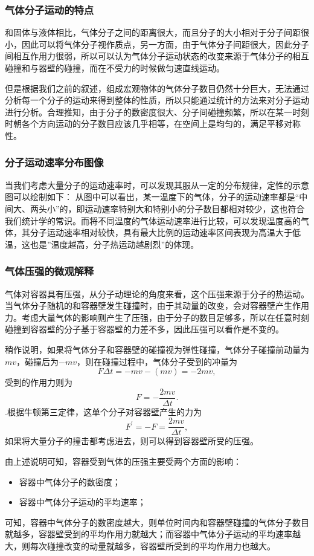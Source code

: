 \subsubsection{气体分子运动的特点}
和固体与液体相比，气体分子之间的距离很大，而且分子的大小相对于分子间距很小，因此可以将气体分子视作质点，另一方面，由于气体分子间距很大，因此分子间相互作用力很弱，所以可以认为气体分子运动状态的改变来源于气体分子的相互碰撞和与器壁的碰撞，而在不受力的时候做匀速直线运动。

但是根据我们之前的叙述，组成宏观物体的气体分子数目仍然十分巨大，无法通过分析每一个分子的运动来得到整体的性质，所以只能通过统计的方法来对分子运动进行分析。合理推知，由于分子的数密度很大、分子间碰撞频繁，所以在某一时刻时朝各个方向运动的分子数目应该几乎相等，在空间上是均匀的，满足平移对称性。

\subsubsection{分子运动速率分布图像}
当我们考虑大量分子的运动速率时，可以发现其服从一定的分布规律，定性的示意图可以绘制如下：
从图中可以看出，某一温度下的气体，分子的运动速率都是“中间大、两头小”的，即运动速率特别大和特别小的分子数目都相对较少，这也符合我们统计学的常识。而将不同温度的气体运动速率进行比较，可以发现温度高的气体，其分子运动速率相对较快，具有最大比例的运动速率区间表现为高温大于低温，这也是”温度越高，分子热运动越剧烈”的体现。
\subsubsection{气体压强的微观解释}
气体对容器具有压强，从分子动理论的角度来看，这个压强来源于分子的热运动。当气体分子随机的和容器壁发生碰撞时，由于其动量的改变，会对容器壁产生作用力。考虑大量气体的影响则产生了压强，由于分子的数目足够多，所以在任意时刻碰撞到容器壁的分子基于容器壁的力差不多，因此压强可以看作是不变的。

稍作说明，如果将气体分子和容器壁的碰撞视为弹性碰撞，气体分子碰撞前动量为$mv$，碰撞后为$-mv$，则在碰撞过程中，气体分子受到的冲量为$$F\Delta t=-mv-(mv)=-2mv,$$受到的作用力则为$$F=-\dfrac{2mv}{\Delta t}.$$.根据牛顿第三定律，这单个分子对容器壁产生的力为$$F^\prime=-F=\dfrac{2mv}{\Delta t},$$如果将大量分子的撞击都考虑进去，则可以得到容器壁所受的压强。

由上述说明可知，容器受到气体的压强主要受两个方面的影响：
\begin{itemize}
\item 容器中气体分子的数密度；
\item 容器中气体分子运动的平均速率；
\end{itemize}
可知，容器中气体分子的数密度越大，则单位时间内和容器壁碰撞的气体分子数目就越多，容器壁受到的平均作用力就越大；而容器中气体分子运动的平均速率越大，则每次碰撞改变的动量就越多，容器壁所受到的平均作用力也越大。
